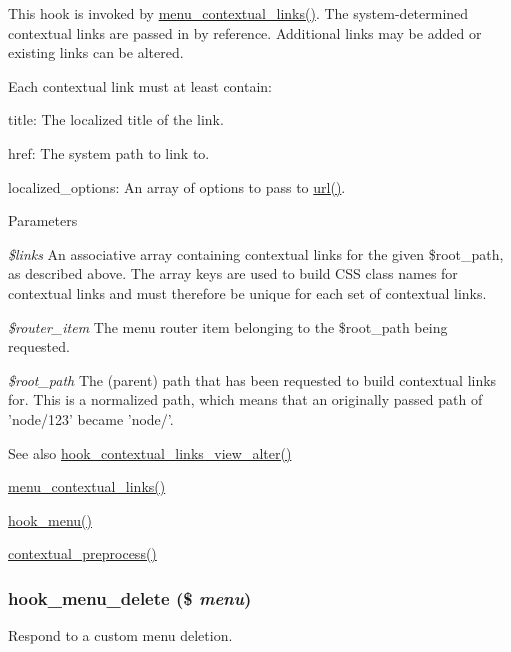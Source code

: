 This hook is invoked by \hyperlink{group__menu_gad524d9a3415e24d27c7dbcb333d96cf8}{menu\_\-contextual\_\-links()}. The system-\/determined contextual links are passed in by reference. Additional links may be added or existing links can be altered.

Each contextual link must at least contain:
\begin{DoxyItemize}
\item title: The localized title of the link.
\item href: The system path to link to.
\item localized\_\-options: An array of options to pass to \hyperlink{common_8inc_a43b2a0594431556db49df980801d8807}{url()}.
\end{DoxyItemize}


\begin{DoxyParams}{Parameters}
\item[{\em \$links}]An associative array containing contextual links for the given \$root\_\-path, as described above. The array keys are used to build CSS class names for contextual links and must therefore be unique for each set of contextual links. \item[{\em \$router\_\-item}]The menu router item belonging to the \$root\_\-path being requested. \item[{\em \$root\_\-path}]The (parent) path that has been requested to build contextual links for. This is a normalized path, which means that an originally passed path of 'node/123' became 'node/'.\end{DoxyParams}
\begin{DoxySeeAlso}{See also}
\hyperlink{group__hooks_ga30ebdd98be1d239b608b769bda0ca9f0}{hook\_\-contextual\_\-links\_\-view\_\-alter()} 

\hyperlink{group__menu_gad524d9a3415e24d27c7dbcb333d96cf8}{menu\_\-contextual\_\-links()} 

\hyperlink{group__hooks_ga5c95244fea59b25666e409759e133ded}{hook\_\-menu()} 

\hyperlink{contextual_8module_a2c7f7612d49ab547e1b47afed806a21e}{contextual\_\-preprocess()} 
\end{DoxySeeAlso}
\hypertarget{group__hooks_gaef8c43d600c4efbae913dc3841a93199}{
\subsubsection[{hook\_\-menu\_\-delete}]{\setlength{\rightskip}{0pt plus 5cm}hook\_\-menu\_\-delete (\$ {\em menu})}}
\label{group__hooks_gaef8c43d600c4efbae913dc3841a93199}
Respond to a custom menu deletion.

